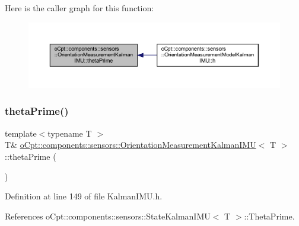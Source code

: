 Here is the caller graph for this function\+:
\nopagebreak
\begin{figure}[H]
\begin{center}
\leavevmode
\includegraphics[width=350pt]{classo_cpt_1_1components_1_1sensors_1_1_orientation_measurement_kalman_i_m_u_a57d5317eec50b4027ca91682a348d301_icgraph}
\end{center}
\end{figure}
\hypertarget{classo_cpt_1_1components_1_1sensors_1_1_orientation_measurement_kalman_i_m_u_a987232bfd59e49bd602acc0c71b69b20}{}\label{classo_cpt_1_1components_1_1sensors_1_1_orientation_measurement_kalman_i_m_u_a987232bfd59e49bd602acc0c71b69b20} 
\subsubsection{\texorpdfstring{theta\+Prime()}{thetaPrime()}\hspace{0.1cm}{\footnotesize\ttfamily [2/2]}}
{\footnotesize\ttfamily template$<$typename T $>$ \\
T\& \hyperlink{classo_cpt_1_1components_1_1sensors_1_1_orientation_measurement_kalman_i_m_u}{o\+Cpt\+::components\+::sensors\+::\+Orientation\+Measurement\+Kalman\+I\+MU}$<$ T $>$\+::theta\+Prime (\begin{DoxyParamCaption}{ }\end{DoxyParamCaption})\hspace{0.3cm}{\ttfamily [inline]}}



Definition at line 149 of file Kalman\+I\+M\+U.\+h.



References o\+Cpt\+::components\+::sensors\+::\+State\+Kalman\+I\+M\+U$<$ T $>$\+::\+Theta\+Prime.



